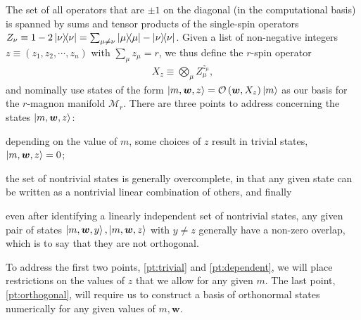 \documentclass[nofootinbib,notitlepage,11pt]{revtex4-2}
\newcommand{\p}[1]{\left(#1\right)} %
\newcommand{\m}{\bm} %
\newcommand{\1}{\mathds{1}}
\newcommand{\M}{\mathcal{M}}
\renewcommand{\O}{\mathcal{O}}
\begin{document}
The set of all operators that are $\pm1$ on the diagonal (in the
computational basis) is spanned by sums and tensor products of the
single-spin operators
$Z_\nu\equiv1-2\op\nu=\sum_{\mu\ne\nu}\op\mu-\op\nu$.  Given a list of
non-negative integers $z\equiv\p{z_1,z_2,\cdots,z_n}$ with
$\sum_\mu z_\mu=r$, we thus define the $r$-spin operator
\begin{align}
  X_z \equiv \bigotimes_\mu Z_\mu^{z_\mu},
\end{align}
and nominally use states of the form
$\ket{m,\m w,z}=\O\p{\m w,X_z}\ket{m}$ as our basis for the $r$-magnon
manifold $\M_r$.  There are three points to address concerning the
states $\ket{m,\m w,z}$:
\begin{enumerate*}
\item depending on the value of $m$, some choices of $z$ result in
  trivial states, $\ket{m,\m w,z}=0$;
  \label{pt:trivial}
\item the set of nontrivial states is generally overcomplete, in that
  any given state can be written as a nontrivial linear combination of
  others, and finally
  \label{pt:dependent}
\item even after identifying a linearly independent set of nontrivial
  states, any given pair of states $\ket{m,\m w,y},\ket{m,\m w,z}$
  with $y\ne z$ generally have a non-zero overlap, which is to say
  that they are not orthogonal.
  \label{pt:orthogonal}
\end{enumerate*}
To address the first two points, \ref{pt:trivial} and
\ref{pt:dependent}, we will place restrictions on the values of $z$
that we allow for any given $m$.  The last point, \ref{pt:orthogonal},
will require us to construct a basis of orthonormal states numerically
for any given values of $m,\m w$.
\end{document}
